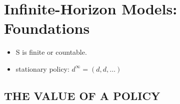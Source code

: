 

\section{Infinite-Horizon Models: Foundations}%
\label{sec:infinite_horizon_models_foundations}

\begin{itemize}
    \item S is finite or countable.
    \item stationary policy: $ d^\infty = (d, d, \ldots) $ 
\end{itemize}

\subsection{THE VALUE OF A POLICY}%
\label{sub:the_value_of_a_policy}

